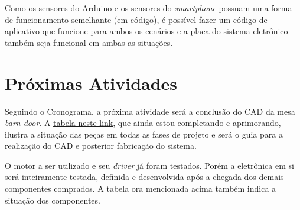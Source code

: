 \documentclass[a4paper, 12pt]{article}
\begin{document}
Como os sensores do Arduino e os sensores do \textit{smartphone} possuam uma forma de funcionamento semelhante (em código), é possível fazer um código de aplicativo que funcione para ambos os cenários e a placa do sistema eletrônico também seja funcional em ambas as situações.

\section{Próximas Atividades}

Seguindo o Cronograma, a próxima atividade será a conclusão do CAD da mesa \textit{barn-door}. A \href{https://docs.google.com/spreadsheets/d/1AbPNhJbIAHxrgyp-HbyYSLwaWb71SL8_rIbzwGyOWhE/edit?usp=sharing}{tabela neste link}, que ainda estou completando e aprimorando,
ilustra a situação das peças em todas as fases de projeto e será o guia para a realização do CAD e posterior fabricação do sistema. 

O motor a ser utilizado e seu \textit{driver} já foram testados. Porém a eletrônica em si será inteiramente testada, definida e desenvolvida após a chegada dos demais componentes comprados. A tabela ora mencionada acima também indica a situação dos componentes. 
\end{document}
